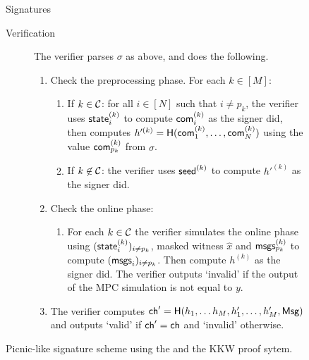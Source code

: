 \begin{figure}[p]
\begin{minipage}[t]{1.1\textwidth}
\begin{protocolbox}{\ttOWF Signatures}
\begin{description}
    \item[Verification] The verifier parses $\sigma$ as above, and does the following.  
    \begin{enumerate}
        \item Check the preprocessing phase. For each $k\in[M]$:
        \begin{enumerate}
        \item If $k \in \mathcal{C}$: for all $i\in[N]$  such that $i \neq p_k$, the verifier uses $\textsf{state}^{(k)}_{i}$ to compute $\textsf{com}^{(k)}_{i}$ as 
            the signer did, then computes $h'^{(k)} = \textsf{H}(\textsf{com}^{(k)}_{1},\ldots,\textsf{com}^{(k)}_{N})$ using 
            the value $\textsf{com}^{(k)}_{p_k}$ from $\sigma$. 
        \item If $k\not\in\mathcal{C}$: the verifier uses $\textsf{seed}^{(k)}$ to compute $h'^{(k)}$ as the signer did.
        \end{enumerate} 
        
        \item Check the online phase:
        \begin{enumerate}
            \item For each $k \in \mathcal{C}$ the verifier simulates the online phase using $(\textsf{state}^{(k)}_{i})_{i \neq p_k}$,  
                masked witness $\hat{x}$ and $\textsf{msgs}^{(k)}_{p_k}$ to compute $(\textsf{msgs}_i)_{i \neq p_k}$. 
                Then compute $h^{(k)}$ as the signer did. The verifier outputs `invalid' if the output of the MPC simulation is not equal to $y$.
        \end{enumerate}
    \item The verifier computes $\textsf{ch}' = \textsf{H}(h_1, \ldots h_M, h_1', \ldots, h_M', \textsf{Msg})$ and outputs `valid' if $\textsf{ch}' = \textsf{ch}$ and `invalid' otherwise. 
    \end{enumerate}
 \end{description}
 \end{protocolbox}
 \end{minipage}
	\vspace*{-10pt}
	\caption{\label{fig:23-picnic}Picnic-like signature scheme using the \ttOWF and the KKW proof sytem.} 
\end{figure}

